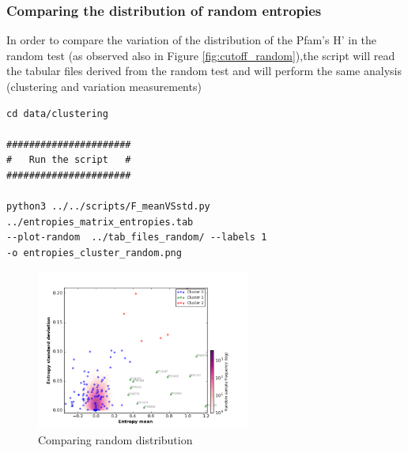 \documentclass[a4paper,11pt]{report}
\begin{document}
\subsubsection{Comparing  the distribution of random entropies}
In order to compare the variation of the distribution of the Pfam's H' in the random test (as observed also in Figure \ref{fig:cutoff_random}),the script will read the tabular files derived from the random test and will perform the same analysis (clustering and variation measurements) 
\begin{verbatim}
cd data/clustering

######################
#   Run the script   #
######################

python3 ../../scripts/F_meanVSstd.py  ../entropies_matrix_entropies.tab 
--plot-random  ../tab_files_random/ --labels 1 
-o entropies_cluster_random.png

\end{verbatim}
\begin{figure}[H]
  \centering
    \includegraphics[width=70mm, scale=1]{entropies_random_labels.png}
    \caption{Comparing random distribution}
        \label{fig:cluster_random}
\end{figure}
\end{document}
